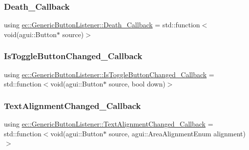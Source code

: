 \subsubsection{\texorpdfstring{Death\+\_\+\+Callback}{Death\_Callback}}
{\footnotesize\ttfamily using \mbox{\hyperlink{classec_1_1_generic_button_listener_aa7ca8b30098ab89eff663950d25a13eb}{ec\+::\+Generic\+Button\+Listener\+::\+Death\+\_\+\+Callback}} =  std\+::function$<$void(agui\+::\+Button$\ast$ source)$>$}

\mbox{\label{classec_1_1_generic_button_listener_a7830a9f92b6e68acbbf5237d2154db95}} 
\subsubsection{\texorpdfstring{Is\+Toggle\+Button\+Changed\+\_\+\+Callback}{IsToggleButtonChanged\_Callback}}
{\footnotesize\ttfamily using \mbox{\hyperlink{classec_1_1_generic_button_listener_a7830a9f92b6e68acbbf5237d2154db95}{ec\+::\+Generic\+Button\+Listener\+::\+Is\+Toggle\+Button\+Changed\+\_\+\+Callback}} =  std\+::function$<$void(agui\+::\+Button$\ast$ source, bool down)$>$}

\mbox{\label{classec_1_1_generic_button_listener_a62ab7e0ca7d7777b9aec72d7f2caf300}} 
\subsubsection{\texorpdfstring{Text\+Alignment\+Changed\+\_\+\+Callback}{TextAlignmentChanged\_Callback}}
{\footnotesize\ttfamily using \mbox{\hyperlink{classec_1_1_generic_button_listener_a62ab7e0ca7d7777b9aec72d7f2caf300}{ec\+::\+Generic\+Button\+Listener\+::\+Text\+Alignment\+Changed\+\_\+\+Callback}} =  std\+::function$<$void(agui\+::\+Button$\ast$ source, agui\+::\+Area\+Alignment\+Enum alignment)$>$}

